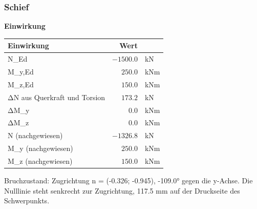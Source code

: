 \documentclass[11pt,a4paper]{article}
\begin{document}
\subsubsection{Schief}
\noindent\textbf{Einwirkung}
\begin{longtable}{lrl}
\hline
Einwirkung & Wert &  \\
\hline
\endhead
N\_Ed & $-1500.0$ & kN \\
M\_y,Ed & $250.0$ & kNm \\
M\_z,Ed & $150.0$ & kNm \\
ΔN aus Querkraft und Torsion & $173.2$ & kN \\
ΔM\_y & $0.0$ & kNm \\
ΔM\_z & $0.0$ & kNm \\
N (nachgewiesen) & $-1326.8$ & kN \\
M\_y (nachgewiesen) & $250.0$ & kNm \\
M\_z (nachgewiesen) & $150.0$ & kNm \\
\hline
\end{longtable}
Bruchzustand: Zugrichtung n = (-0.326; -0.945), -109.0° gegen die y-Achse. Die Nulllinie steht senkrecht zur Zugrichtung, 117.5 mm auf der Druckseite des Schwerpunkts.
\end{document}
